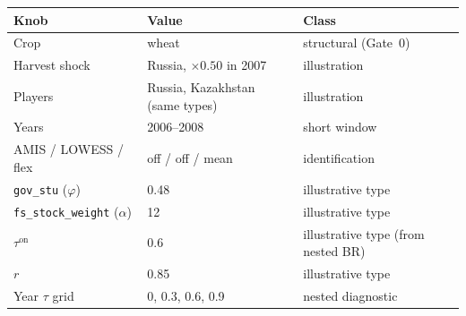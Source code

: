 \begin{center}
\small
{}
\label{tab:knobs}
\begin{tabular}{lll}
\toprule
Knob & Value & Class \\
\midrule
Crop & wheat & structural (Gate~0) \\
Harvest shock & Russia, \(\times 0.50\) in 2007 & illustration \\
Players & Russia, Kazakhstan (same types) & illustration \\
Years & 2006--2008 & short window \\
AMIS / LOWESS / flex & off / off / mean & identification \\
\texttt{gov\_stu} (\(\varphi\)) & 0.48 & illustrative type \\
\texttt{fs\_stock\_weight} (\(\alpha\)) & 12 & illustrative type \\
\(\tau^{\mathrm{on}}\) & 0.6 & illustrative type (from nested BR) \\
\(r\) & 0.85 & illustrative type \\
Year \(\tau\) grid & 0, 0.3, 0.6, 0.9 & nested diagnostic \\
\bottomrule
\end{tabular}
\end{center}
\vspace{0.6em}
